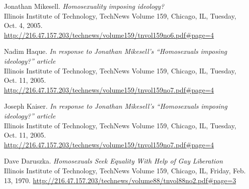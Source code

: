 \documentclass[a4paper,12pt]{article}
\begin{document}
\begin{thebibliography}{9}

Jonathan Mikesell.
\textit{Homosexuality imposing ideology?} \\
Illinois Institute of Technology, TechNews Volume 159, Chicago, IL, Tuesday, Oct. 4, 2005.
\url{http://216.47.157.203/technews/volume159/tnvol159no6.pdf#page=4}

Nadim Haque.
\textit{In response to Jonathan Mikesell's “Homosexuals imposing ideology?” article} \\
Illinois Institute of Technology, TechNews Volume 159, Chicago, IL, Tuesday, Oct. 11, 2005.
\url{http://216.47.157.203/technews/volume159/tnvol159no7.pdf#page=4}

Joseph Kaiser.
\textit{In response to Jonathan Mikesell's “Homosexuals imposing ideology?” article} \\
Illinois Institute of Technology, TechNews Volume 159, Chicago, IL, Tuesday, Oct. 11, 2005.
\url{http://216.47.157.203/technews/volume159/tnvol159no7.pdf#page=4}

Dave Daruszka.
\textit{Homosexuals Seek Equality With Help of Gay Liberation} \\
Illinois Institute of Technology, TechNews Volume 159, Chicago, IL, Friday, Feb. 13, 1970.
\url{http://216.47.157.203/technews/volume88/tnvol88no2.pdf#page=3}


\end{thebibliography}

\newpage

\end{document}
